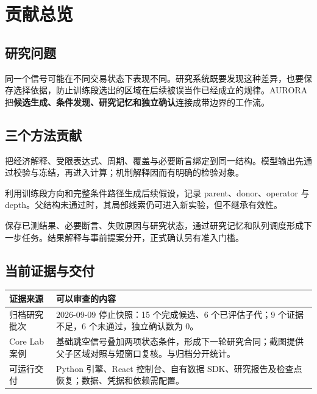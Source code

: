
\setcounter{page}{1}

\section*{贡献总览}

\subsection*{研究问题}
同一个信号可能在不同交易状态下表现不同。研究系统既要发现这种差异，也要保存选择依据，防止训练段选出的区域在后续被误当作已经成立的规律。AURORA 把\textbf{候选生成、条件发现、研究记忆和独立确认}连接成带边界的工作流。

\subsection*{三个方法贡献}
\begin{description}[leftmargin=1em,style=nextline]
\item[\textcolor{aurorablue}{01\quad 机制到合同：让研究问题可执行}]
把经济解释、受限表达式、周期、覆盖与必要断言绑定到同一结构。模型输出先通过校验与冻结，再进入计算；机制解释因而有明确的检验对象。
\item[\textcolor{aurorablue}{02\quad 异质性到子代：让局部线索可继续研究}]
利用训练段方向和完整条件路径生成后续假设，记录 parent、donor、operator 与 depth。父结构未通过时，其局部线索仍可进入新实验，但不继承有效性。
\item[\textcolor{aurorablue}{03\quad 证据到记忆：让支持与冲突共同影响下一轮}]
保存已测结果、必要断言、失败原因与研究状态，通过研究记忆和队列调度形成下一步任务。结果解释与事前提案分开，正式确认另有准入门槛。
\end{description}

\subsection*{当前证据与交付}
\begin{tabularx}{\textwidth}{@{}p{}X@{}}
\toprule
\textbf{证据来源} & \textbf{可以审查的内容} \\
\midrule
归档研究批次 & 2026-09-09 停止快照：15 个完成候选、6 个已评估子代；9 个证据不足，6 个未通过，独立确认数为 0。\\
Core Lab 案例 & 基础跳空信号叠加两项状态条件，形成下一轮研究合同；截图提供父子区域对照与短窗口复核。与归档分开统计。\\
可运行交付 & Python 引擎、React 控制台、自有数据 SDK、研究报告及检查点恢复；数据、凭据和依赖需配置。\\
\bottomrule
\end{tabularx}

